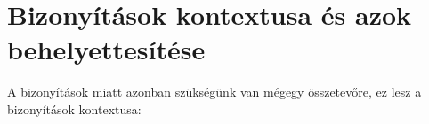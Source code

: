 \section{Bizonyítások kontextusa és azok behelyettesítése}

A bizonyítások miatt azonban szükségünk van mégegy összetevőre, ez lesz a bizonyítások kontextusa:
\begin{code}%
\>[0]\AgdaSpace{}%
\AgdaSpace{}%
\AgdaSymbol{:}\AgdaSpace{}%
\AgdaSpace{}%
\AgdaSpace{}%
\AgdaSpace{}%
\<%
\\
\>[0][@{}l@{\AgdaIndent{0}}]%
\>[2]\AgdaSpace{}%
\AgdaSymbol{:}\AgdaSpace{}%
\AgdaSymbol{\}}\AgdaSpace{}%
\AgdaSpace{}%
\AgdaSpace{}%
\<%
\\
%
\>[2]\AgdaSpace{}%
\AgdaSymbol{:}\AgdaSpace{}%
\AgdaSymbol{\}}\AgdaSpace{}%
\AgdaSpace{}%
\AgdaSpace{}%
\AgdaSpace{}%
\AgdaSpace{}%
\AgdaSpace{}%
\AgdaSpace{}%
\AgdaSpace{}%
\AgdaSpace{}%
\<%
\end{code}

